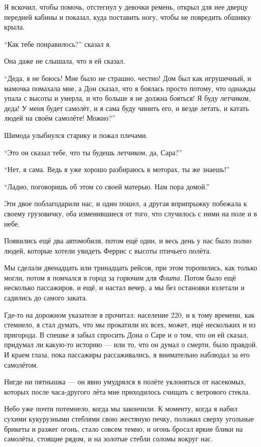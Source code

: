 Я вскочил, чтобы помочь, отстегнул у девочки ремень, открыл для нее дверцу передней кабины и
 показал, куда поставить ногу, чтобы не повредить обшивку крыла.

``Как тебе понравилось?'' сказал я.

Она даже не слышала, что я ей сказал.

``Деда, я не боюсь! Мне было не страшно, честно! Дом был как игрушечный, и мамочка помахала мне, а
 Дон сказал, что я боялась просто потому, что однажды упала с высоты и умерла, и что больше я не
 должна бояться! Я буду летчиком, деда! У меня будет самолёт, и я сама буду чинить его, и везде
 летать, и катать людей на своём самолёте! Можно?''

Шимода улыбнулся старику и пожал плечами.

``Это он сказал тебе, что ты будешь летчиком, да, Сара?''

``Нет, я сама. Ведь я уже хорошо разбираюсь в моторах, ты же знаешь!''

``Ладно, поговоришь об этом со своей матерью. Нам пора домой.''

Эти двое поблагодарили нас, и один пошел, а другая вприпрыжку побежала к своему грузовичку, оба изменившиеся от того, что случилось с ними на поле и в небе.

Появились ещё два автомобиля, потом ещё один, и весь день у нас было полно людей, которые хотели увидеть Феррис с высоты птичьего полёта.

Мы сделали двенадцать или тринадцать рейсов, при этом торопились, как только могли, потом я
помчался в город за горючим для {\it Флита}. Потом было ещё несколько пассажиров, и ещё, и настал вечер, а мы без остановки взлетали и садились до самого заката.

Где-то на дорожном указателе я прочитал: население 220, и к тому времени, как стемнело, я стал
думать, что мы прокатили их всех, может, ещё нескольких и из пригорода. В спешке я забыл спросить Дона о Саре и о том, что он ей сказал, придумал ли какую-то историю --- или то, что он думал о смерти, было правдой. И краем глаза, пока пассажиры рассаживались, я внимательно наблюдал за его самолётом.

Нигде ни пятнышка --- он явно умудрялся в полёте уклоняться от насекомых, которых после
 часа-другого лёта мне приходилось счищать с ветрового стекла.

Небо уже почти потемнело, когда мы закончили. К моменту, когда я набил сухими кукурузными стеблями
 свою жестяную печку, положил сверху угольные брикеты и разжег огонь, стало совсем темно, и огонь
 бросал яркие блики на самолёты, стоящие рядом, и на золотые стебли соломы вокруг нас.

